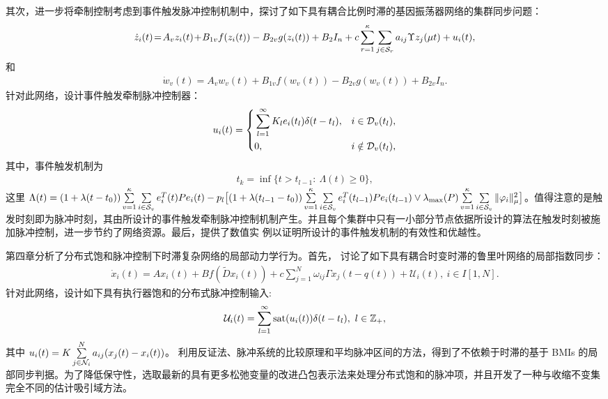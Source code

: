 其次，进一步将牵制控制考虑到事件触发脉冲控制机制中，探讨了如下具有耦合比例时滞的基因振荡器网络的集群同步问题： 
\begin{align*} 
\begin{split}
\dot{z}_i(t)\!=\!A_vz_i(t)\!+\!B_{1v}f(z_i(t))-B_{2v}g (z_i(t))+B_2I_n
+c\sum\limits\limits_{r=1}^{\kappa}\sum\limits\limits_{j\in \mathcal{S}_r}a_{ij}\Upsilon z_j(\mu t)+u_i(t),
\end{split}
\end{align*}
和 
\begin{align*} 
\dot{w}_v(t)=A_vw_v(t)+B_{1v}f(w_v(t))-B_{2v}g (w_v(t))
+B_{2v}I_n.
\end{align*}
针对此网络，设计事件触发牵制脉冲控制器：
\begin{align*} 
u_i(t)=\left\{
\begin{aligned}
&\sum\limits\limits_{l=1}^{\infty} K_le_i(t_l)\delta (t-t_l),&i\in \mathcal{D}_v(t_l),\\
&0,&i\notin\mathcal{D}_v(t_l),
\end{aligned}
\right.
\end{align*}
其中，事件触发机制为
\begin{align*} 
t_k=\inf\{t>t_{l-1}:\  \Lambda (t)\geq 0\},
\end{align*}
这里 $\Lambda (t)=(1+ \lambda ( t-t_0))\sum\limits\limits_{v=1}^{\kappa}\sum\limits\limits_{i\in \mathcal{S}_v}e^T_i(t)Pe_i(t)-p_l\big[(1+ \lambda ( t_{l-1}-t_0))\sum\limits\limits_{v=1}^{\kappa}\sum\limits\limits_{i\in \mathcal{S}_v}e^T_i(t_{l-1})Pe_i(t_{l-1})\vee \lambda_{\max}(P)\sum\limits\limits_{v=1}^{\kappa}\sum\limits\limits_{i\in \mathcal{S}_v}\|\varphi_i\|^2_{\mu}\big]$。值得注意的是触发时刻即为脉冲时刻，其由所设计的事件触发牵制脉冲控制机制产生。并且每个集群中只有一小部分节点依据所设计的算法在触发时刻被施加脉冲控制，进一步节约了网络资源。最后，提供了数值实
例以证明所设计的事件触发机制的有效性和优越性。
 
第四章分析了分布式饱和脉冲控制下时滞复杂网络的局部动力学行为。首先，
讨论了如下具有耦合时变时滞的鲁里叶网络的局部指数同步： 
\begin{align*} 
\dot{x}_i(t)=A x_i(t)+ Bf(\tilde{D}x_i(t)) +c\sum\limits_{j=1}^N \omega_{ij}\varGamma x_j(t-q (t))+\mathcal{U}_i(t),\ i\in I[1,N].
\end{align*}
针对此网络，设计如下具有执行器饱和的分布式脉冲控制输入:
\begin{align*} 
\mathcal{U}_i(t)=\sum\limits_{l=1}^{\infty}{\rm sat}(u_i(t)) \delta(t-t_l),\ l\in\mathbb{Z}_+,
\end{align*} 
其中
$
u_i(t)=K \sum\limits\limits_{j\in \mathcal{N}_i}^{N}a_{ij}(x_j(t)-x_i(t))
$。 利用反证法、脉冲系统的比较原理和平均脉冲区间的方法，得到了不依赖于时滞的基于 BMIs 的局部同步判据。为了降低保守性，选取最新的具有更多松弛变量的改进凸包表示法来处理分布式饱和的脉冲项，并且开发了一种与收缩不变集完全不同的估计吸引域方法。


